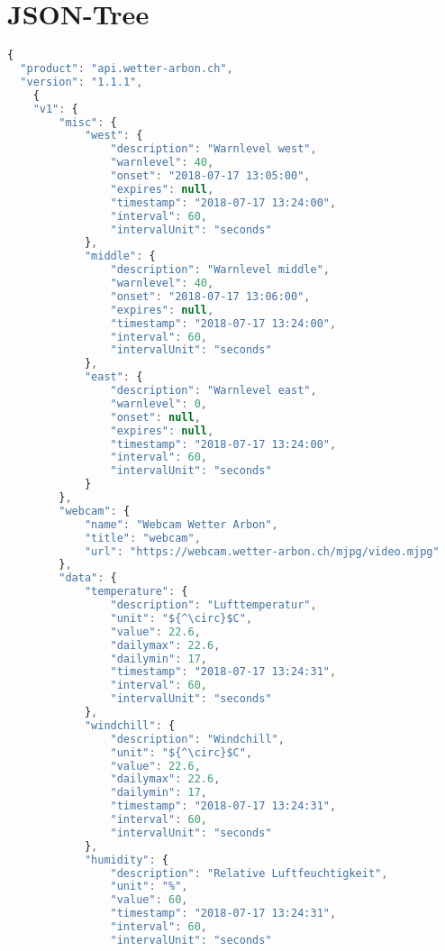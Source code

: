 \section{JSON-Tree}

\begin{lstlisting}[label=lst:JsonTree,caption=Json Struktur, language=JavaScript, style=htmlcssjs, mathescape]
{
  "product": "api.wetter-arbon.ch",
  "version": "1.1.1",
	{
    "v1": {
        "misc": {
            "west": {
                "description": "Warnlevel west",
                "warnlevel": 40,
                "onset": "2018-07-17 13:05:00",
                "expires": null,
                "timestamp": "2018-07-17 13:24:00",
                "interval": 60,
                "intervalUnit": "seconds"
            },
            "middle": {
                "description": "Warnlevel middle",
                "warnlevel": 40,
                "onset": "2018-07-17 13:06:00",
                "expires": null,
                "timestamp": "2018-07-17 13:24:00",
                "interval": 60,
                "intervalUnit": "seconds"
            },
            "east": {
                "description": "Warnlevel east",
                "warnlevel": 0,
                "onset": null,
                "expires": null,
                "timestamp": "2018-07-17 13:24:00",
                "interval": 60,
                "intervalUnit": "seconds"
            }
        },
        "webcam": {
            "name": "Webcam Wetter Arbon",
            "title": "webcam",
            "url": "https://webcam.wetter-arbon.ch/mjpg/video.mjpg"
        },
        "data": {
            "temperature": {
                "description": "Lufttemperatur",
                "unit": "${^\circ}$C",
                "value": 22.6,
                "dailymax": 22.6,
                "dailymin": 17,
                "timestamp": "2018-07-17 13:24:31",
                "interval": 60,
                "intervalUnit": "seconds"
            },
            "windchill": {
                "description": "Windchill",
                "unit": "${^\circ}$C",
                "value": 22.6,
                "dailymax": 22.6,
                "dailymin": 17,
                "timestamp": "2018-07-17 13:24:31",
                "interval": 60,
                "intervalUnit": "seconds"
            },
            "humidity": {
                "description": "Relative Luftfeuchtigkeit",
                "unit": "%",
                "value": 60,
                "timestamp": "2018-07-17 13:24:31",
                "interval": 60,
                "intervalUnit": "seconds"

\end{lstlisting}
